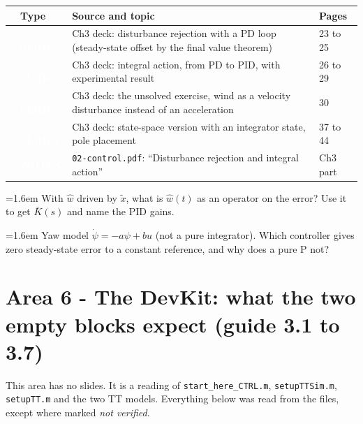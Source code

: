 \documentclass[10pt,a4paper]{article}
\newcommand{\cb}{\raisebox{-0.35ex}{\Large$\square$}}
\newcommand{\srctag}[2]{\colorbox{#1}{\textcolor{white}{\textbf{\scriptsize\,#2\,}}}}
\newcommand{\SLIDES}{\srctag{slides}{SLIDES}}
\newcommand{\NOTES}{\srctag{notes}{NOTES}}
\newcommand{\chk}[1]{\par\noindent\hangindent=1.6em\hangafter=1 \cb\hspace{0.6em}#1}
\begin{document}
\begin{tabularx}{\textwidth}{@{}C T X l@{}}
\toprule
\cb & Type & Source and topic & Pages\\
\midrule
\cb & \SLIDES & Ch3 deck: disturbance rejection with a PD loop (steady-state offset by the final value theorem) & 23 to 25\\
\cb & \SLIDES & Ch3 deck: integral action, from PD to PID, with experimental result & 26 to 29\\
\cb & \SLIDES & Ch3 deck: the unsolved exercise, wind as a velocity disturbance instead of an acceleration & 30\\
\cb & \SLIDES & Ch3 deck: state-space version with an integrator state, pole placement & 37 to 44\\
\cb & \NOTES & \texttt{02-control.pdf}: ``Disturbance rejection and integral action'' & Ch3 part\\
\bottomrule
\end{tabularx}
\begin{selfcheck}
\chk{With $\hat w$ driven by $\tilde x$, what is $\hat w(t)$ as an operator on the error? Use it to get $\bar K(s)$ and name the PID gains.}
\chk{Yaw model $\dot\psi=-a\psi+bu$ (not a pure integrator). Which controller gives zero steady-state error to a constant reference, and why does a pure P not?}
\end{selfcheck}

\section*{Area 6 - The DevKit: what the two empty blocks expect \hfill\normalfont\small (guide 3.1 to 3.7)}

This area has no slides.
It is a reading of \texttt{start\_here\_CTRL.m}, \texttt{setupTTSim.m}, \texttt{setupTT.m} and the two TT models.
Everything below was read from the files, except where marked \emph{not verified}.
\end{document}
